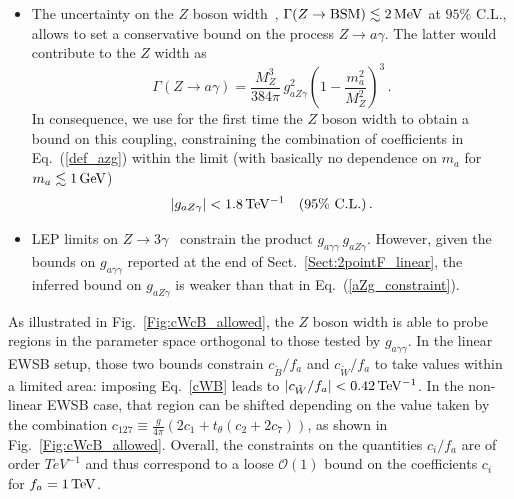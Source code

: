 \documentclass[11pt]{article}
\newcommand{\g}{\gamma}
\newcommand{\Wt}{{\tilde{W}}}
\newcommand{\cl}{\%\,\,  \text{C.L.}}
\renewcommand{\to}{\rightarrow}
\renewcommand{\[}{\begin{equation}}
\renewcommand{\]}{\end{equation}}
\begin{document}
\begin{itemize}
  \item The uncertainty on the $Z$ boson width~\cite{Agashe:2014kda}, $\Gamma(Z\to\text{BSM}) \lesssim \unit[2]{MeV}$ at $95\cl$, 
 allows to set a conservative bound on the process $Z\to a\g$. The latter would contribute to the $Z$ width as
 \begin{equation}
  \Gamma(Z\to a \g)=\frac{M_Z^3}{384\pi}\, g_{aZ\g}^2\left(1-\frac{m_a^2}{M_Z^2}\right)^3\,.
 \end{equation} 
In consequence, we use for the first time the $Z$ boson width to obtain a bound on this coupling,
constraining the combination of coefficients in Eq.~(\ref{def_azg}) within the limit (with basically no dependence on $m_a$ for $m_a\lesssim\unit[1]{GeV}$)
\begin{equation}\label{aZg_constraint}
 |g_{aZ\g}|<\unit[1.8]{TeV^{-1}}\quad(95\cl)\,.
\end{equation}

\item LEP limits on $Z \to 3 \g$~\cite{Jaeckel:2015jla} constrain  the product $g_{a\gamma\gamma} \, g_{aZ\gamma}$.
However, given the bounds on $g_{a\gamma\gamma}$ reported at the end of Sect.~\ref{Sect:2pointF_linear}, the inferred bound on $g_{aZ\gamma}$ is weaker than 
that in Eq.~(\ref{aZg_constraint}). 

\end{itemize}
As illustrated in Fig.~\ref{Fig:cWcB_allowed}, the $Z$ boson width is able to probe regions in the parameter space orthogonal to those tested by $g_{a\gamma\gamma}$. 
In the linear EWSB setup, those two bounds constrain $c_{\tilde{B}}/f_a$ and $c_{\tilde{W}}/f_a$ to take values within a limited area:  imposing Eq.~\eqref{cWB} 
leads to $|c_\Wt /f_a|< \unit[0.42]{TeV^{-1}}$. 
In the non-linear EWSB case, that region can be shifted depending on the value taken by the 
combination $c_{127}\equiv\frac{g}{4\pi}(2c_1+t_\theta(c_2+2c_7))$, as shown in Fig.~\ref{Fig:cWcB_allowed}. 
Overall, the constraints on the quantities $c_i/f_a$ are of order $\unit{TeV^{-1}}$ and thus correspond to a loose 
$\mathcal{O}(1)$ bound on the coefficients $c_i$ for $f_a=\unit[1]{TeV}$.
\end{document}
